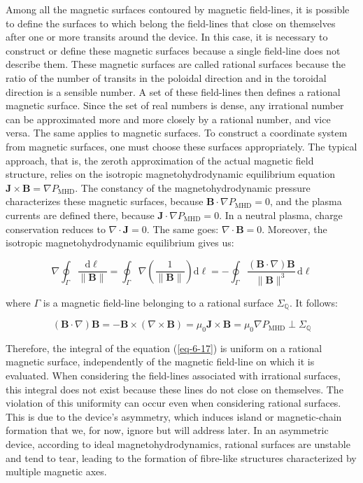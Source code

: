 \quad Among all the magnetic surfaces contoured by magnetic field-lines, it is possible to define the surfaces to which belong the field-lines that close on themselves after one or more transits around the device. In this case, it is necessary to construct or define these magnetic surfaces because a single field-line does not describe them. These magnetic surfaces are called rational surfaces because the ratio of the number of transits in the poloidal direction and in the toroidal direction is a sensible number. A set of these field-lines then defines a rational magnetic surface. Since the set of real numbers is dense, any irrational number can be approximated more and more closely by a rational number, and vice versa. The same applies to magnetic surfaces. To construct a coordinate system from magnetic surfaces, one must choose these surfaces appropriately. The typical approach, that is, the zeroth approximation of the actual magnetic field structure, relies on the isotropic magnetohydrodynamic equilibrium equation $\mathbf{J}\times\mathbf{B}=\nabla P_\text{MHD}$. The constancy of the magnetohydrodynamic pressure characterizes these magnetic surfaces, because $\mathbf{B}\cdot\nabla P_\text{MHD}=0$, and the plasma currents are defined there, because $\mathbf{J}\cdot\nabla P_\text{MHD}=0$. In a neutral plasma, charge conservation reduces to $\nabla\cdot\mathbf{J}=0$. The same goes: $\nabla\cdot\mathbf{B}=0$. Moreover, the isotropic magnetohydrodynamic equilibrium gives us:

\begin{equation}
    \label{eq-6-17}
    \nabla\oint_\Gamma\frac{\mathrm{d}\ell}{\|\mathbf{B}\|}=\oint_\Gamma\nabla\left(\frac{1}{\|\mathbf{B}\|}\right)\mathrm{d}\ell=-\oint_\Gamma\frac{(\mathbf{B}\cdot\nabla)\mathbf{B}}{\|\mathbf{B}\|^3}\,\mathrm{d}\ell
\end{equation}

where $\Gamma$ is a magnetic field-line belonging to a rational surface $\Sigma_\mathbb{Q}$. It follows:

\begin{equation}
    (\mathbf{B}\cdot\nabla)\mathbf{B}=-\mathbf{B}\times\left(\nabla\times\mathbf{B}\right)=\mu_0\mathbf{J}\times\mathbf{B}=\mu_0\nabla P_\text{MHD}\perp\Sigma_\mathbb{Q}
\end{equation}

Therefore, the integral of the equation (\ref{eq-6-17}) is uniform on a rational magnetic surface, independently of the magnetic field-line on which it is evaluated. When considering the field-lines associated with irrational surfaces, this integral does not exist because these lines do not close on themselves. The violation of this uniformity can occur even when considering rational surfaces. This is due to the device's asymmetry, which induces island or magnetic-chain formation that we, for now, ignore but will address later. In an asymmetric device, according to ideal magnetohydrodynamics, rational surfaces are unstable and tend to tear, leading to the formation of fibre-like structures characterized by multiple magnetic axes.

